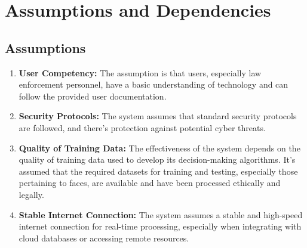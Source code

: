 \documentclass{scrreprt}
\begin{document}
    \section{Assumptions and Dependencies}
        \subsection{Assumptions}
            \begin{enumerate}
                \item \textbf{User Competency:} The assumption is that users, especially law enforcement personnel, have a basic understanding of technology and can follow the provided user documentation.
                \item \textbf{Security Protocols:} The system assumes that standard security protocols are followed, and there's protection against potential cyber threats.
                \item \textbf{Quality of Training Data:} The effectiveness of the system depends on the quality of training data used to develop its decision-making algorithms. It's assumed that the required datasets for training and testing, especially those pertaining to faces, are available and have been processed ethically and legally.
                \item \textbf{Stable Internet Connection:} The system assumes a stable and high-speed internet connection for real-time processing, especially when integrating with cloud databases or accessing remote resources.
            \end{enumerate}
\end{document}
